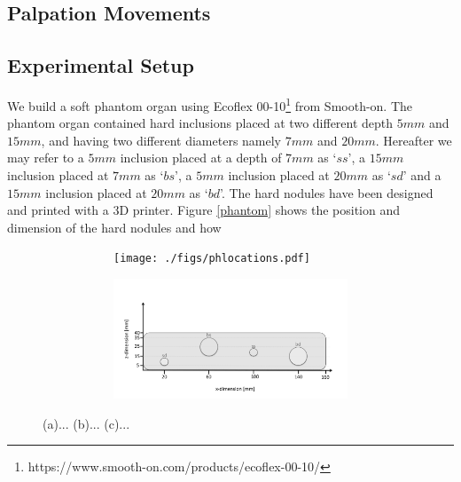 \documentclass[]{interact}
\theoremstyle{plain}%
\theoremstyle{definition}
\theoremstyle{remark}
\begin{document}
\subsection{Palpation Movements}

\subsection{Experimental Setup}

We build a soft phantom organ using Ecoflex 00-10\footnote[2]{https://www.smooth-on.com/products/ecoflex-00-10/} from Smooth-on. The phantom organ contained hard inclusions placed at two different depth $5mm$ and $15mm$, and having two different diameters namely $7mm$ and $20mm$. Hereafter we may refer to a $5mm$ inclusion placed at a depth of $7mm$ as `$ss$', a $15mm$ inclusion placed at $7mm$ as `$bs$', a $5mm$ inclusion placed at $20mm$ as `$sd$' and a $15mm$ inclusion placed at $20mm$ as `$bd$'.
The hard nodules have been designed and printed with a 3D printer.
Figure \ref{phantom} shows the position and dimension of the hard nodules and how 

\begin{figure}[]
	\centering
	\begin{subfigure}[b]{0.48\textwidth}
		\begin{subfigure}[b]{\textwidth}
			\texttt{[image: ./figs/phlocations.pdf]}
			\caption{}
			\label{phantomgrid:3d}
		\end{subfigure} 
		\vspace{0.025\textwidth}
		\begin{subfigure}[b]{\textwidth}
			\includegraphics[width=\textwidth]{./figs/phsidenew.pdf}
			\caption{}
			\label{phantomgrid:description}
		\end{subfigure}
	\end{subfigure}
	\caption{(a)... (b)... (c)... }
	\label{phantomgrid}
\end{figure}
\end{document}
